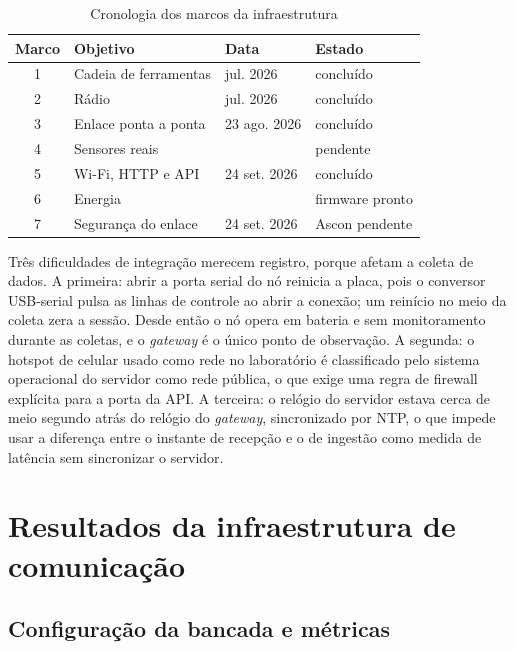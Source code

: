 \begin{table}[htb]
\centering
\caption{Cronologia dos marcos da infraestrutura}
\label{tab:marcos_cronologia}
\begin{tabular}{clll}
\hline
\textbf{Marco} & \textbf{Objetivo} & \textbf{Data} & \textbf{Estado} \\
\hline
1 & Cadeia de ferramentas & jul. 2026 & concluído \\
2 & Rádio & jul. 2026 & concluído \\
3 & Enlace ponta a ponta & 23 ago. 2026 & concluído \\
4 & Sensores reais & & pendente \\
5 & Wi-Fi, HTTP e API & 24 set. 2026 & concluído \\
6 & Energia & & firmware pronto \\
7 & Segurança do enlace & 24 set. 2026 & Ascon pendente \\
\hline
\end{tabular}
\end{table}

Três dificuldades de integração merecem registro, porque afetam a coleta de dados. A primeira: abrir a porta serial do nó reinicia a placa, pois o conversor USB-serial pulsa as linhas de controle ao abrir a conexão; um reinício no meio da coleta zera a sessão. Desde então o nó opera em bateria e sem monitoramento durante as coletas, e o \textit{gateway} é o único ponto de observação. A segunda: o hotspot de celular usado como rede no laboratório é classificado pelo sistema operacional do servidor como rede pública, o que exige uma regra de firewall explícita para a porta da API. A terceira: o relógio do servidor estava cerca de meio segundo atrás do relógio do \textit{gateway}, sincronizado por NTP, o que impede usar a diferença entre o instante de recepção e o de ingestão como medida de latência sem sincronizar o servidor.



\section{Resultados da infraestrutura de comunicação}
\label{sec:resultados_infra}

\subsection{Configuração da bancada e métricas}

